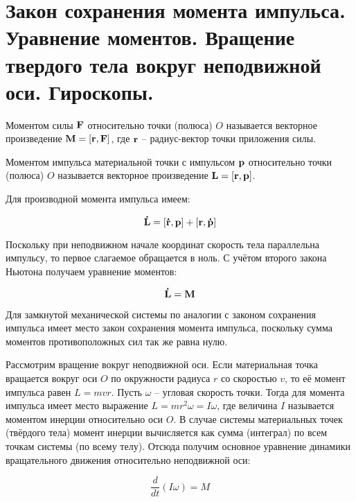 \section{Закон сохранения момента импульса. Уравнение моментов. Вращение твердого тела вокруг неподвижной оси. Гироскопы.}

\begin{definition}
    Моментом силы $\mathbf F$ относительно точки (полюса) $O$ называется векторное произведение $\mathbf M = \left[ \mathbf r, \mathbf F \right]$, где $\mathbf r$ -- радиус-вектор точки приложения силы.
\end{definition}

\begin{definition}
    Моментом импульса материальной точки с импульсом $\mathbf p$ относительно точки (полюса) $O$ называется векторное произведение $\mathbf L = \left[ \mathbf r, \mathbf p \right]$.
\end{definition}

Для производной момента импульса имеем:

\begin{equation*}
    \mathbf{\dot L} = \left[ \mathbf{\dot r}, \mathbf p \right] + \left[ \mathbf r, \mathbf{\dot p} \right]
\end{equation*}

Поскольку при неподвижном начале координат скорость тела параллельна импульсу, то первое слагаемое обращается в ноль. С учётом второго закона Ньютона получаем уравнение моментов:

\begin{equation} \label{eq:уравнение моментов}
    \mathbf{\dot L} = \mathbf M
\end{equation}

Для замкнутой механической системы по аналогии с законом сохранения импульса имеет место закон сохранения момента импульса, поскольку сумма моментов противоположных сил так же равна нулю.

Рассмотрим вращение вокруг неподвижной оси. Если материальная точка вращается вокруг оси $O$ по окружности радиуса $r$ со скоростью $v$, то её момент импульса равен $L = mvr$. Пусть $\omega$ -- угловая скорость точки. Тогда для момента импульса имеет место выражение $L = m r^2 \omega = I \omega$, где величина $I$ называется моментом инерции относительно оси $O$. В случае системы материальных точек (твёрдого тела) момент инерции вычисляется как сумма (интеграл) по всем точкам системы (по всему телу). Отсюда получим основное уравнение динамики вращательного движения относительно неподвижной оси:

\begin{equation}
    \frac{d}{dt}\left( I \omega \right) = M
\end{equation}


